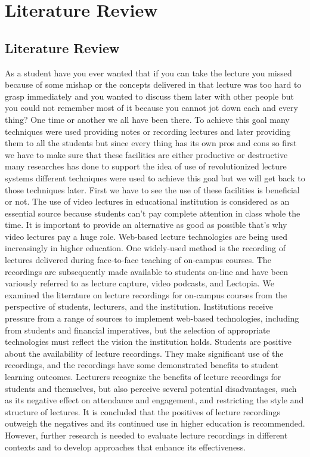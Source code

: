 
\chapter{Literature Review} %
\label{Chapter2}

\section{Literature Review}
As a student have you ever wanted that if you can take the lecture you missed because of some mishap or the concepts delivered in that lecture was too hard to grasp immediately and you wanted to discuss them later with other people but you could not remember most of it because you cannot jot down each and every thing? One time or another we all have been there. To achieve this goal many techniques were used providing notes or recording lectures and later providing them to all the students but since every thing has its own pros and cons so first we have to make sure that these facilities are either productive or destructive many researches has done to support the idea of use of revolutionized lecture systems different techniques were used to achieve this goal but we will get back to those techniques later. First we have to see the use of these facilities is beneficial or not.
The use of video lectures in educational institution is considered as an essential source because students can't pay complete attention in class whole the time. It is important to provide an alternative as good as possible that's why video lectures pay a huge role. Web-based lecture technologies are being used increasingly in higher education. One widely-used method is the recording of lectures delivered during face-to-face teaching of on-campus courses. The recordings are subsequently made available to students on-line and have been variously referred to as lecture capture, video podcasts, and Lectopia. We examined the literature on lecture recordings for on-campus courses from the perspective of students, lecturers, and the institution. Institutions receive pressure from a range of sources to implement web-based technologies, including from students and financial imperatives, but the selection of appropriate technologies must reflect the vision the institution holds. Students are positive about the availability of lecture recordings. They make significant use of the recordings, and the recordings have some demonstrated benefits to student learning outcomes. Lecturers recognize the benefits of lecture recordings for students and themselves, but also perceive several potential disadvantages, such as its negative effect on attendance and engagement, and restricting the style and structure of lectures. It is concluded that the positives of lecture recordings outweigh the negatives and its continued use in higher education is recommended. However, further research is needed to evaluate lecture recordings in different contexts and to develop approaches that enhance its effectiveness.\cite{OCallaghan2017}\\
